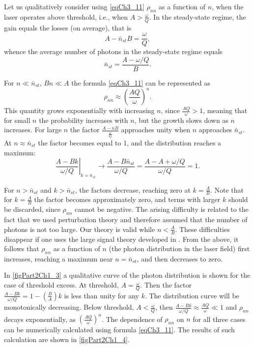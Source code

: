 Let us qualitatively consider using \eqref{eqCh3_11} $\rho_{nn}$ as a function of $n$, when the laser operates above threshold, i.e., when $A > \frac{\omega}{Q}$. In the steady-state regime, the gain equals the losses (on average), that is 
\[
A - \bar{n}_{st} B = \frac{\omega}{Q},
\]
whence the average number of photons in the steady-state regime equals
\[
\bar{n}_{st} = \frac{A - \omega/Q}{B}.
\] 

For $n \ll \bar{n}_{st}$, $B n \ll A$ the formula \eqref{eqCh3_11} can be represented as 
\[
\rho_{nn} \approx \left(\frac{A Q}{\omega}\right)^n.
\]
This quantity grows exponentially with increasing $n$, since $\frac{A Q}{\omega} > 1$, meaning that for small $n$ the probability increases with $n$, but the growth slows down as $n$ increases. For large $n$ the factor
$\frac{A - nB}{\frac{\omega}{Q}}$
approaches unity when $n$ approaches $\bar{n}_{st}$. 
At $n \approx \bar{n}_{st}$ the factor becomes equal to 1, and the distribution reaches a maximum: 
\[
\left.\frac{A - B k}{\omega/Q}\right|_{k = \bar{n}_{st}}
\rightarrow \frac{A - B \bar{n}_{st}}{\omega/Q} = 
\frac{A - A + \omega/Q}{\omega/Q} = 1.
\] 

For $n > \bar{n}_{st}$ and $k > \bar{n}_{st}$, the factors decrease, reaching zero at $k = \frac{A}{B}$. Note that for $k = \frac{A}{B}$ the factor becomes approximately zero, and terms with larger $k$ should be discarded, since $\rho_{nn}$ cannot be negative. The arising difficulty is related to the fact that we used perturbation theory and therefore assumed that the number of photons is not too large. Our theory is valid while $n < \frac{A}{B}$. These difficulties disappear if one uses the large signal theory developed in \cite{bScally1974}. From the above, it follows that $\rho_{nn}$ as a function of $n$ (the photon distribution in the laser field) first increases, reaching a maximum near $n = \bar{n}_{st}$, and then decreases to zero.   



In \autoref{figPart2Ch1_3} a qualitative curve of the photon distribution is shown for the case of threshold excess. At threshold, $A = \frac{\omega}{Q}$. Then the factor $\frac{A - B k}{\omega/Q} = 1 - \left(\frac{B}{A}\right)k$ is less than unity for any $k$. The distribution curve will be monotonically decreasing. Below threshold, $A < \frac{\omega}{Q}$, then $\frac{A - B k}{\omega/Q} \approx \frac{A Q}{\omega} \ll 1$ and $\rho_{nn}$ decays exponentially, as $\left(\frac{A Q}{\omega}\right)^n$. The dependence of $\rho_{nn}$ on $n$ for all three cases can be numerically calculated using formula \eqref{eqCh3_11}. The results of such calculation are shown in \autoref{figPart2Ch1_4}. 

